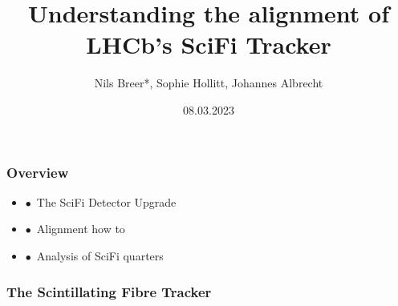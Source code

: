 \documentclass[aspectratio=1610, 12pt]{beamer}
\title{Understanding the alignment of LHCb's SciFi Tracker}
\author[N.Breer]{Nils Breer*, Sophie Hollitt, Johannes Albrecht}
\institute{Technische Universität Dortmund, Fakultät Physik}
\date{08.03.2023}
\begin{document}
\maketitle

\begin{frame}\frametitle{Overview}
  \begin{itemize}
    \item $\bullet$\, The SciFi Detector Upgrade
    \item $\bullet$\, Alignment how to
    \item $\bullet$\, Analysis of SciFi quarters
  \end{itemize}
\end{frame}

\begin{frame}\frametitle{The Scintillating Fibre Tracker}
  \begin{columns}
    \begin{column}[c]{0.48\textwidth}
      \begin{figure}



\end{figure}
\end{column}
\end{columns}
\end{frame}
\end{document}
